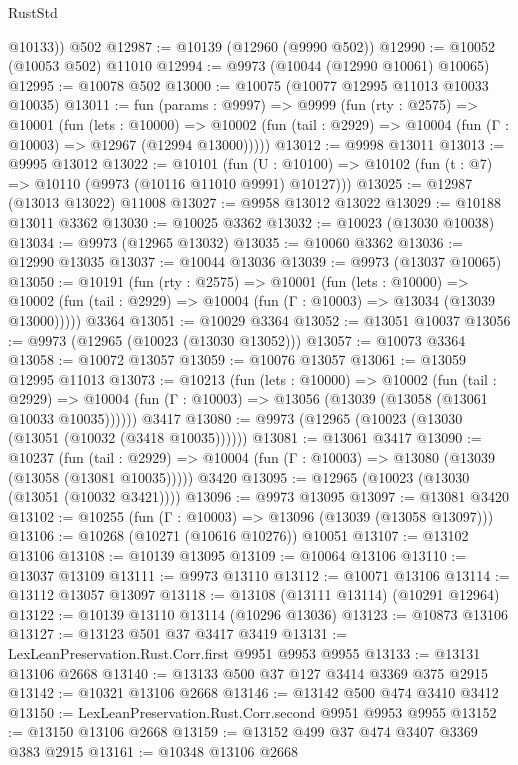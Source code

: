 \begin{lexlean}{RustStd}
\begin{coremodule}
        @10133))
    @502
@12987 := @10139 (@12960 (@9990 @502))
@12990 := @10052 (@10053 @502) @11010
@12994 := @9973 (@10044 (@12990 @10061) @10065)
@12995 := @10078 @502
@13000 := @10075 (@10077 @12995 @11013 @10033 @10035)
@13011 := fun (params : @9997) =>
  @9999
    (fun (rty : @2575) =>
    @10001
      (fun (lets : @10000) =>
      @10002 (fun (tail : @2929) => @10004 (fun (Γ : @10003) => @12967 (@12994 @13000)))))
@13012 := @9998 @13011
@13013 := @9995 @13012
@13022 := @10101
    (fun (U : @10100) => @10102 (fun (t : @7) => @10110 (@9973 (@10116 @11010 @9991) @10127)))
@13025 := @12987 (@13013 @13022) @11008
@13027 := @9958 @13012 @13022
@13029 := @10188 @13011 @3362
@13030 := @10025 @3362
@13032 := @10023 (@13030 @10038)
@13034 := @9973 (@12965 @13032)
@13035 := @10060 @3362
@13036 := @12990 @13035
@13037 := @10044 @13036
@13039 := @9973 (@13037 @10065)
@13050 := @10191
    (fun (rty : @2575) =>
    @10001
      (fun (lets : @10000) =>
      @10002 (fun (tail : @2929) => @10004 (fun (Γ : @10003) => @13034 (@13039 @13000)))))
    @3364
@13051 := @10029 @3364
@13052 := @13051 @10037
@13056 := @9973 (@12965 (@10023 (@13030 @13052)))
@13057 := @10073 @3364
@13058 := @10072 @13057
@13059 := @10076 @13057
@13061 := @13059 @12995 @11013
@13073 := @10213
    (fun (lets : @10000) =>
    @10002
      (fun (tail : @2929) =>
      @10004 (fun (Γ : @10003) => @13056 (@13039 (@13058 (@13061 @10033 @10035))))))
    @3417
@13080 := @9973 (@12965 (@10023 (@13030 (@13051 (@10032 (@3418 @10035))))))
@13081 := @13061 @3417
@13090 := @10237
    (fun (tail : @2929) => @10004 (fun (Γ : @10003) => @13080 (@13039 (@13058 (@13081 @10035)))))
    @3420
@13095 := @12965 (@10023 (@13030 (@13051 (@10032 @3421))))
@13096 := @9973 @13095
@13097 := @13081 @3420
@13102 := @10255 (fun (Γ : @10003) => @13096 (@13039 (@13058 @13097)))
@13106 := @10268 (@10271 (@10616 @10276)) @10051
@13107 := @13102 @13106
@13108 := @10139 @13095
@13109 := @10064 @13106
@13110 := @13037 @13109
@13111 := @9973 @13110
@13112 := @10071 @13106
@13114 := @13112 @13057 @13097
@13118 := @13108 (@13111 @13114) (@10291 @12964)
@13122 := @10139 @13110 @13114 (@10296 @13036)
@13123 := @10873 @13106
@13127 := @13123 @501 @37 @3417 @3419
@13131 := LexLeanPreservation.Rust.Corr.first @9951 @9953 @9955
@13133 := @13131 @13106 @2668
@13140 := @13133 @500 @37 @127 @3414 @3369 @375 @2915
@13142 := @10321 @13106 @2668
@13146 := @13142 @500 @474 @3410 @3412
@13150 := LexLeanPreservation.Rust.Corr.second @9951 @9953 @9955
@13152 := @13150 @13106 @2668
@13159 := @13152 @499 @37 @474 @3407 @3369 @383 @2915
@13161 := @10348 @13106 @2668

\end{coremodule}
\end{lexlean}
